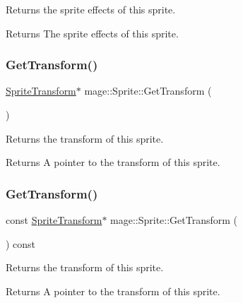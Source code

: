Returns the sprite effects of this sprite.

\begin{DoxyReturn}{Returns}
The sprite effects of this sprite. 
\end{DoxyReturn}
\hypertarget{classmage_1_1_sprite_aa28e031e38c51619b3bd7853d212ae06}{}\label{classmage_1_1_sprite_aa28e031e38c51619b3bd7853d212ae06} 
\subsubsection{\texorpdfstring{Get\+Transform()}{GetTransform()}\hspace{0.1cm}{\footnotesize\ttfamily [1/2]}}
{\footnotesize\ttfamily \hyperlink{structmage_1_1_sprite_transform}{Sprite\+Transform}$\ast$ mage\+::\+Sprite\+::\+Get\+Transform (\begin{DoxyParamCaption}{ }\end{DoxyParamCaption})\hspace{0.3cm}{\ttfamily [noexcept]}}

Returns the transform of this sprite.

\begin{DoxyReturn}{Returns}
A pointer to the transform of this sprite. 
\end{DoxyReturn}
\hypertarget{classmage_1_1_sprite_a8e2c0ae634492efacc92aab2e18e701c}{}\label{classmage_1_1_sprite_a8e2c0ae634492efacc92aab2e18e701c} 
\subsubsection{\texorpdfstring{Get\+Transform()}{GetTransform()}\hspace{0.1cm}{\footnotesize\ttfamily [2/2]}}
{\footnotesize\ttfamily const \hyperlink{structmage_1_1_sprite_transform}{Sprite\+Transform}$\ast$ mage\+::\+Sprite\+::\+Get\+Transform (\begin{DoxyParamCaption}{ }\end{DoxyParamCaption}) const\hspace{0.3cm}{\ttfamily [noexcept]}}

Returns the transform of this sprite.

\begin{DoxyReturn}{Returns}
A pointer to the transform of this sprite. 
\end{DoxyReturn}
\hypertarget{classmage_1_1_sprite_a8da2f573b61fc381e279931747e7d44e}{}\label{classmage_1_1_sprite_a8da2f573b61fc381e279931747e7d44e} 
